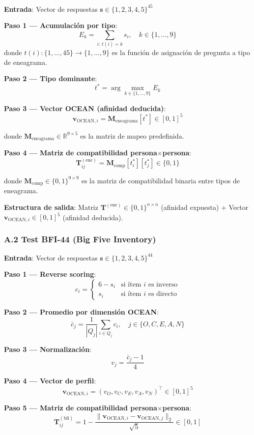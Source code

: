 \documentclass[12pt,a4paper]{article}
\begin{document}
\begin{formulaBox}
\textbf{Entrada}: Vector de respuestas $\mathbf{s} \in \{1,2,3,4,5\}^{45}$

\textbf{Paso 1 --- Acumulación por tipo}:
\[
E_k = \sum_{i:\, t(i)=k} s_i, \quad k \in \{1, \ldots, 9\}
\]
donde $t(i): \{1,\ldots,45\} \to \{1,\ldots,9\}$ es la función de asignación de pregunta a tipo de eneagrama.

\textbf{Paso 2 --- Tipo dominante}:
\[
t^* = \arg\max_{k \in \{1,\ldots,9\}} E_k
\]

\textbf{Paso 3 --- Vector OCEAN (afinidad deducida)}:
\[
\mathbf{v}_{\text{OCEAN},i} = \mathbf{M}_{\text{eneagrama}}[t^*] \in [0,1]^5
\]

donde $\mathbf{M}_{\text{eneagrama}} \in \mathbb{R}^{9 \times 5}$ es la matriz de mapeo predefinida.

\textbf{Paso 4 --- Matriz de compatibilidad persona$\times$persona}:
\[
\mathbf{T}^{(\text{ene})}_{ij} = \mathbf{M}_{\text{comp}}[t^*_i][t^*_j] \in \{0, 1\}
\]

donde $\mathbf{M}_{\text{comp}} \in \{0,1\}^{9 \times 9}$ es la matriz de compatibilidad binaria entre tipos de eneagrama.
\end{formulaBox}

\textbf{Estructura de salida}: Matriz $\mathbf{T}^{(\text{ene})} \in \{0,1\}^{n \times n}$ (afinidad expuesta) + Vector $\mathbf{v}_{\text{OCEAN},i} \in [0,1]^5$ (afinidad deducida).

\subsubsection{A.2 Test BFI-44 (Big Five Inventory)}

\begin{formulaBox}
\textbf{Entrada}: Vector de respuestas $\mathbf{s} \in \{1,2,3,4,5\}^{44}$

\textbf{Paso 1 --- Reverse scoring}:
\[
c_i = \begin{cases} 6 - s_i & \text{si ítem } i \text{ es inverso} \\ s_i & \text{si ítem } i \text{ es directo} \end{cases}
\]

\textbf{Paso 2 --- Promedio por dimensión OCEAN}:
\[
\bar{c}_j = \frac{1}{|Q_j|} \sum_{i \in Q_j} c_i, \quad j \in \{O, C, E, A, N\}
\]

\textbf{Paso 3 --- Normalización}:
\[
v_j = \frac{\bar{c}_j - 1}{4}
\]

\textbf{Paso 4 --- Vector de perfil}:
\[
\mathbf{v}_{\text{OCEAN},i} = (v_O, v_C, v_E, v_A, v_N)^\top \in [0,1]^5
\]

\textbf{Paso 5 --- Matriz de compatibilidad persona$\times$persona}:
\[
\mathbf{T}^{(\text{bfi})}_{ij} = 1 - \frac{\|\mathbf{v}_{\text{OCEAN},i} - \mathbf{v}_{\text{OCEAN},j}\|_2}{\sqrt{5}} \in [0, 1]
\]
\end{formulaBox}
\end{document}
